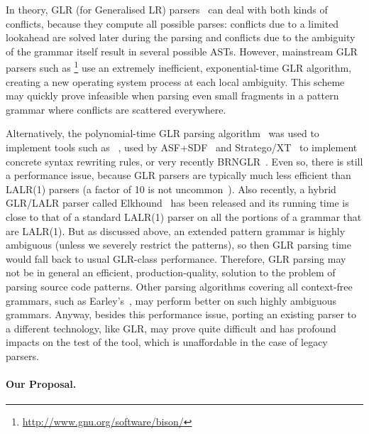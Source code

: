 In theory, GLR (for Generalised LR) parsers~\cite{glr} can deal with
both kinds of conflicts, because they compute all possible parses:
conflicts due to a limited lookahead are solved later during the
parsing and conflicts due to the ambiguity of the grammar itself
result in several possible ASTs. However, mainstream GLR parsers such
as \Bison\footnote{\url{http://www.gnu.org/software/bison/}} use an
extremely inefficient, exponential\hyp{}time GLR algorithm, creating a
new operating system process at each local ambiguity. This scheme may
quickly prove infeasible when parsing even small fragments in a
pattern grammar where conflicts are scattered everywhere.

Alternatively, the polynomial\hyp{}time GLR parsing
algorithm~\cite{glr} was used to implement tools such as
\SDF~\cite{sdf}, used by \textsf{ASF+SDF}~\cite{asf+sdf} and
\textsf{Stratego/XT}~\cite{metaprog} to implement concrete syntax
rewriting rules, or very recently BRNGLR~\cite{brnglr}. Even so, there
is still a performance issue, because GLR parsers are typically much
less efficient than LALR(1) parsers (a factor of 10 is not
uncommon~\cite{elkhound}). Also recently, a hybrid GLR/LALR parser
called \textsf{Elkhound}~\cite{elkhound} has been released and its
running time is close to that of a standard LALR(1) parser on all the
portions of a grammar that are LALR(1). But as discussed above, an
extended pattern grammar is highly ambiguous (unless we severely
restrict the patterns), so then GLR parsing time would fall back to
usual GLR\hyp{}class performance. Therefore, GLR parsing may not be in
general an efficient, production\hyp{}quality, solution to the problem
of parsing source code patterns. Other parsing algorithms covering all
context\hyp{}free grammars, such as Earley's~\cite{earley}, may
perform better on such highly ambiguous grammars. Anyway, besides this
performance issue, porting an existing parser to a different
technology, like GLR, may prove quite difficult and has profound
impacts on the test of the tool, which is unaffordable in the case of
legacy parsers.



\paragraph{Our Proposal.}


